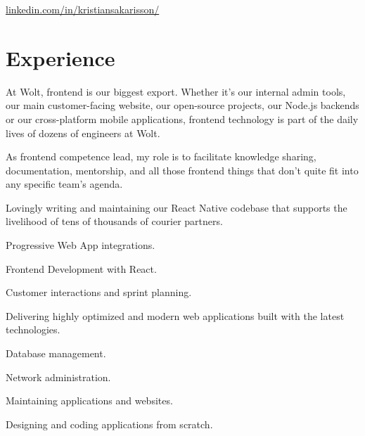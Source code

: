 \documentclass[]{deedy-resume-openfont}
\begin{document}

\href{https://www.linkedin.com/in/kristiansakarisson/}{linkedin.com/in/kristiansakarisson/}

\section{Experience}

\begin{tightemize}
\item At Wolt, frontend is our biggest export. Whether it's our internal admin tools, our main customer-facing website, our open-source projects, our Node.js backends or our cross-platform mobile applications, frontend technology is part of the daily lives of dozens of engineers at Wolt.

\item As frontend competence lead, my role is to facilitate knowledge sharing, documentation, mentorship, and all those frontend things that don't quite fit into any specific team's agenda.
\end{tightemize}
\sectionsep

\begin{tightemize}
\item Lovingly writing and maintaining our React Native codebase that supports the livelihood of tens of thousands of courier partners.
\end{tightemize}
\sectionsep

\begin{tightemize}
\item Progressive Web App integrations.
\item Frontend Development with React.
\item Customer interactions and sprint planning.
\item Delivering highly optimized and modern web applications built with the latest technologies.
\end{tightemize}
\sectionsep

\begin{tightemize}
\item Database management.
\item Network administration.
\item Maintaining applications and websites.
\item Designing and coding applications from scratch.
\end{tightemize}
\sectionsep
\end{document}
